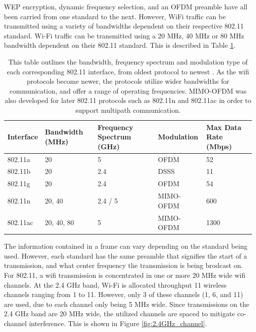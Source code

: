 WEP encryption, dynamic frequency selection, and an OFDM preamble have all been carried from one standard to the next. However, WiFi traffic can be transmitted using a variety of bandwidths dependent on their respective 802.11 standard. Wi-Fi traffic can be transmitted using a 20 MHz, 40 MHz or 80 MHz bandwidth dependent on their 802.11 standard. This is described in Table \ref{table:wifi_protocols}. 
\begin{table}[ht]
\centering
\caption{This table outlines the bandwidth, frequency spectrum and modulation type of each corresponding 802.11 interface, from oldest protocol to newest \cite{wifi_book}. As the wifi protocols become newer, the protocols utilize wider bandwidths for communication, and offer a range of operating frequencies. MIMO-OFDM was also developed for later 802.11 protocols such as 802.11n and 802.11ac in order to support multipath communication.}
\label{table:wifi_protocols}
\begin{tabular}{|l|l|p{3.7cm}|l|p{3cm}|} 
  \hline
  Interface & Bandwidth (MHz) & Frequency Spectrum (GHz) & Modulation & Max Data Rate (Mbps)\\ \hline
          802.11a &              20 &                  5 &       OFDM & 52 \\
          802.11b &              20 &                2.4 &       DSSS & 11 \\
          802.11g &              20 &                2.4 &       OFDM & 54 \\
          802.11n &          20, 40 &            2.4 / 5 &  MIMO-OFDM & 600 \\
         802.11ac &      20, 40, 80 &                  5 &  MIMO-OFDM & 1300 \\ \hline
\end{tabular}
\end{table}\par
The information contained in a frame can vary depending on the standard being used. However, each standard has the same preamble that signifies the start of a transmission, and what center frequency the transmission is being brodcast on.  For 802.11, a wifi transmission is concentrated in one or more 20 MHz wide wifi channels. At the 2.4 GHz band, Wi-Fi is allocated throughput 11 wireless channels ranging from 1 to 11.  However, only 3 of these channels (1, 6, and 11) are used, due to each channel only being 5 MHz wide.  Since transmissions on the 2.4 GHz band are 20 MHz wide, the utilized channels are spaced to mitigate co-channel interference. This is shown in Figure \ref{fig:2.4GHz_channel}.

